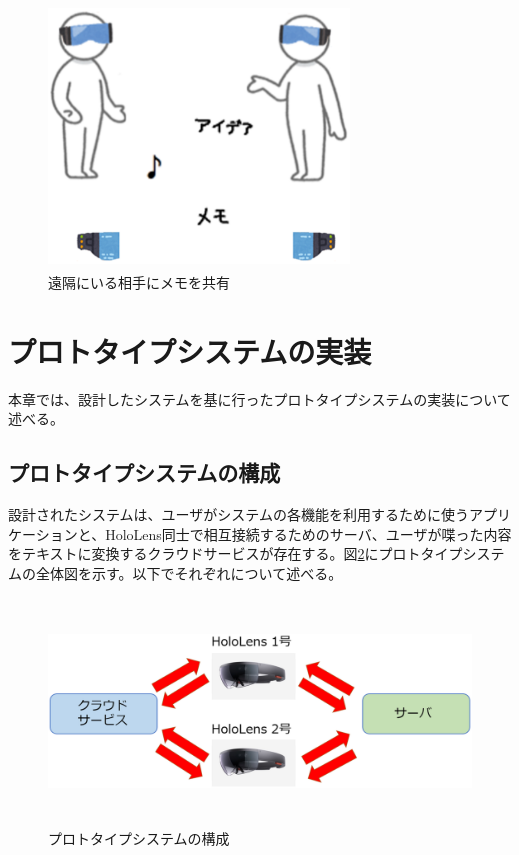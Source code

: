 \documentclass[11pt,a4j, titlepage]{jarticle} %
\begin{document}
\begin{figure}[H]
  \begin{center}
    \includegraphics[clip,height=7.0cm,width=8.0cm]{./sharing_enkaku.eps}
    \caption{遠隔にいる相手にメモを共有}
    \label{fig:sharing_enkaku}
  \end{center}
\end{figure}


\newpage
\section{プロトタイプシステムの実装}
本章では、設計したシステムを基に行ったプロトタイプシステムの実装について述べる。

\subsection{プロトタイプシステムの構成}
設計されたシステムは、ユーザがシステムの各機能を利用するために使うアプリケーションと、HoloLens同士で相互接続するためのサーバ、ユーザが喋った内容をテキストに変換するクラウドサービスが存在する。図\ref{fig:prototypesystem}にプロトタイプシステムの全体図を示す。以下でそれぞれについて述べる。

\begin{figure}[H]
  \begin{center}
    \includegraphics[clip,height=6.0cm,width=14.0cm]{./prototypesystem.eps}
    \caption{プロトタイプシステムの構成}
    \label{fig:prototypesystem}
  \end{center}
\end{figure}
\end{document}
